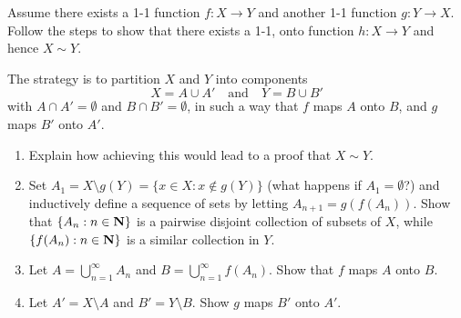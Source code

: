 \documentclass{lew98_solutions}
\begin{document}
\begin{exercise}
\label{ex:1.5.11}
    Assume there exists a 1-1 function \( f : X \to Y \) and another 1-1 function \( g : Y \to X \). Follow the steps to show that there exists a 1-1, onto function \( h : X \to Y \) and hence \( X \sim Y \).

    The strategy is to partition \( X \) and \( Y \) into components
    \[
        X = A \cup A' \quad \text{and} \quad Y = B \cup B'
    \]
    with \( A \cap A' = \emptyset \) and \( B \cap B' = \emptyset \), in such a way that \( f \) maps \( A \) onto \( B \), and \( g \) maps \( B' \) onto \( A' \).
    \begin{enumerate}
        \item Explain how achieving this would lead to a proof that \( X \sim Y \).

        \item Set \( A_1 = X \setminus g(Y) = \{ x \in X : x \not\in g(Y) \} \) (what happens if \( A_1 = \emptyset \)?) and inductively define a sequence of sets by letting \( A_{n+1} = g(f(A_n)) \). Show that \( \{ A_n : n \in \mathbf{N} \} \) is a pairwise disjoint collection of subsets of \( X \), while \( \{ f(A_n) : n \in \mathbf{N} \} \) is a similar collection in \( Y \).

        \item Let \( A = \bigcup_{n=1}^{\infty} A_n \) and \( B = \bigcup_{n=1}^{\infty} f(A_n) \). Show that \( f \) maps \( A \) onto \( B \).

        \item Let \( A' = X \setminus A \) and \( B' = Y \setminus B \). Show \( g \) maps \( B' \) onto \( A' \).
    \end{enumerate}
\end{exercise}
\end{document}
